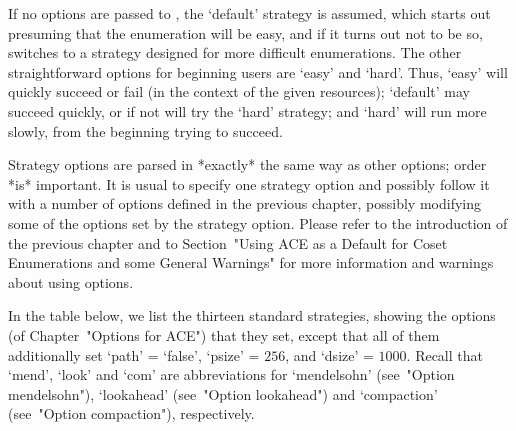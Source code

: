If no options are passed to {\ACE}, the `default' strategy is assumed,
which starts out presuming that the enumeration will be easy,  and  if
it turns out not to be so, {\ACE} switches to a strategy designed  for
more difficult enumerations. The  other  straightforward  options  for
beginning users are `easy'  and  `hard'.  Thus,  `easy'  will  quickly
succeed or fail (in the context of the given resources); `default' may
succeed quickly, or if not will try the `hard'  strategy;  and  `hard'
will run more slowly, from the beginning trying to succeed.

Strategy options are  parsed  in  *exactly*  the  same  way  as  other
options; order *is* important. It is usual  to  specify  one  strategy
option and possibly follow it with a number of options defined in  the
previous chapter, possibly modifying some of the options  set  by  the
strategy option. Please refer to  the  introduction  of  the  previous
chapter and to Section~"Using ACE as a Default for Coset  Enumerations
and some General Warnings" for more  information  and  warnings  about
using options.

In the table below, we list the thirteen standard strategies,  showing
the options (of Chapter~"Options for ACE")  that  they
set, except that all  of  them  additionally  set  `path'  =  `false',
`psize' = $256$, and `dsize' = $1000$. Recall that `mend', `look'  and
`com' are abbreviations for  `mendelsohn'  (see~"Option  mendelsohn"),
`lookahead' (see~"Option  lookahead")  and  `compaction'  (see~"Option
compaction"), respectively.

